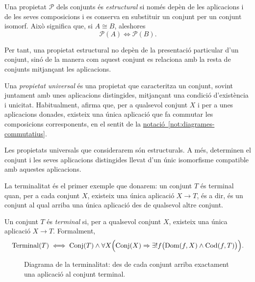 \begin{observacio}
\label{obs:propietats-estructurals-universals}

Una propietat \(\mathcal P\) dels conjunts és \emph{estructural}
si només depèn de les aplicacions i de les seves composicions i es
conserva en substituir un conjunt per un conjunt isomorf. Això
significa que, si \(A\cong B\), aleshores
\[
\mathcal P(A)\Longleftrightarrow\mathcal P(B).
\]

Per tant, una propietat estructural no depèn de la presentació
particular d'un conjunt, sinó de la manera com aquest conjunt es
relaciona amb la resta de conjunts mitjançant les aplicacions.

Una \emph{propietat universal} és una propietat que caracteritza
un conjunt, sovint juntament amb unes aplicacions distingides,
mitjançant una condició d'existència i unicitat. Habitualment,
afirma que, per a qualsevol conjunt \(X\) i per a unes aplicacions
donades, existeix una única aplicació que fa commutar les
composicions corresponents, en el sentit de la
\hyperref[not:diagrames-commutatius]{notació~\ref*{not:diagrames-commutatius}}.

Les propietats universals que considerarem són estructurals.
A més, determinen el conjunt i les seves aplicacions distingides
llevat d'un únic isomorfisme compatible amb aquestes aplicacions.

La terminalitat és el primer exemple que donarem: un conjunt \(T\) és terminal
quan, per a cada conjunt \(X\), existeix una única aplicació
\(X\to T\), és a dir, és un conjunt al qual arriba una única aplicació des de qualsevol altre conjunt.
\end{observacio}

\begin{definicio}\label{def:terminal}
Un conjunt \(T\) és \emph{terminal} si, per a qualsevol conjunt \(X\), existeix una única aplicació \(X\to T\). Formalment,
\[
\operatorname{Terminal}(T)
\iff
\operatorname{Conj}(T)\land
\forall X\Bigl(
  \operatorname{Conj}(X)\Rightarrow
  \exists!f\bigl(\operatorname{Dom}(f,X)\land \operatorname{Cod}(f,T)\bigr)
\Bigr).
\]
\end{definicio}

\begin{figure}[H]
  \centering
  \caption{Diagrama de la terminalitat: des de cada conjunt arriba exactament una aplicació al conjunt terminal.}
  \label{fig:terminal}
\end{figure}

